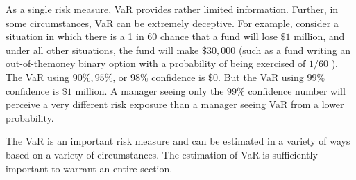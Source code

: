 \documentclass[11pt]{article}
\begin{document}
As a single risk measure, VaR provides rather limited information. Further, in some circumstances, VaR can be extremely deceptive. For example, consider a situation in which there is a 1 in 60 chance that a fund will lose $\$ 1$ million, and under all other situations, the fund will make $\$ 30,000$ (such as a fund writing an out-of-themoney binary option with a probability of being exercised of $1 / 60$ ). The VaR using $90 \%, 95 \%$, or $98 \%$ confidence is $\$ 0$. But the VaR using $99 \%$ confidence is $\$ 1$ million. A manager seeing only the $99 \%$ confidence number will perceive a very different risk exposure than a manager seeing VaR from a lower probability.

The VaR is an important risk measure and can be estimated in a variety of ways based on a variety of circumstances. The estimation of VaR is sufficiently important to warrant an entire section.
\end{document}
